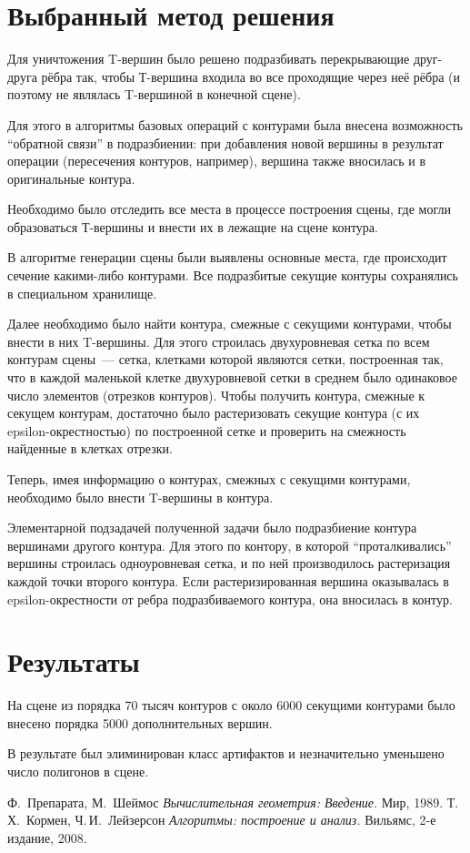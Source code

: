 \documentclass[a4paper,10pt,titlepage]{report}
\begin{document}
\section*{Выбранный метод решения}
Для уничтожения T-вершин было решено подразбивать перекрывающие друг-друга рёбра так, 
чтобы Т-вершина входила во все проходящие через неё рёбра 
(и поэтому не являлась T-вершиной в конечной сцене).

Для этого в алгоритмы базовых операций с контурами была внесена возможность ``обратной связи'' в подразбиении: 
при добавления новой вершины в результат операции (пересечения контуров, например), 
вершина также вносилась и в оригинальные контура.

Необходимо было отследить все места в процессе построения сцены, 
где могли образоваться Т-вершины и внести их в лежащие на сцене контура.

В алгоритме генерации сцены были выявлены основные места, 
где происходит сечение какими-либо контурами.
Все подразбитые секущие контуры сохранялись в специальном хранилище.

Далее необходимо было найти контура, смежные с секущими контурами, 
чтобы внести в них T-вершины.
Для этого строилась двухуровневая сетка по всем контурам сцены~---
сетка, клетками которой являются сетки, построенная так, 
что в каждой маленькой клетке двухуровневой сетки в среднем было одинаковое число элементов 
(отрезков контуров).
Чтобы получить контура, смежные к секущем контурам, достаточно было растеризовать секущие 
контура (с их epsilon-окрестностью) по построенной сетке и проверить на смежность 
найденные в клетках отрезки.

Теперь, имея информацию о контурах, смежных с секущими контурами, 
необходимо было внести T-вершины в контура.

Элементарной подзадачей полученной задачи было подразбиение контура вершинами другого контура.
Для этого по контору, в которой ``проталкивались'' вершины строилась одноуровневая сетка, 
и по ней производилось растеризация каждой точки второго контура. 
Если растеризированная вершина оказывалась в epsilon-окрестности от ребра подразбиваемого контура, 
она вносилась в контур.

\section*{Результаты}
На сцене из порядка 70 тысяч контуров с около 6000 секущими контурами было внесено порядка 5000 дополнительных вершин.

В результате был элиминирован класс артифактов и незначительно уменьшено число полигонов в сцене.

\begin{thebibliography}{9}
  Ф.~Препарата, М.~Шеймос
  \emph{Вычислительная геометрия: Введение}.
  Мир,
  1989.
  Т.\,Х.~Кормен, Ч.\,И.~Лейзерсон
  \emph{Алгоритмы: построение и анализ.}
  Вильямс,
  2-е издание,
  2008.
\end{thebibliography}
\end{document}
